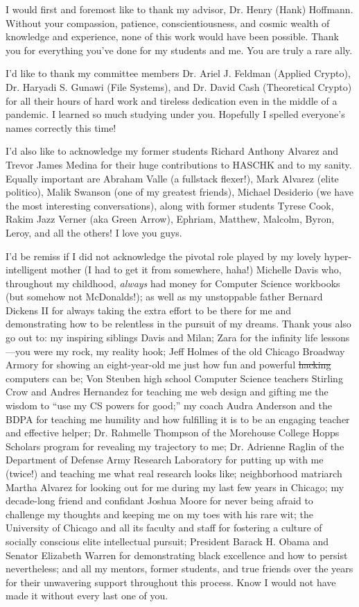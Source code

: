 \acknowledgments
I would first and foremost like to thank my advisor, Dr. Henry (Hank) Hoffmann.
Without your compassion, patience, conscientiousness, and cosmic wealth of
knowledge and experience, none of this work would have been possible. Thank you
for everything you've done for my students and me. You are truly a rare ally.

I'd like to thank my committee members Dr. Ariel J. Feldman (Applied Crypto),
Dr. Haryadi S. Gunawi (File Systems), and Dr. David Cash (Theoretical Crypto)
for all their hours of hard work and tireless dedication even in the middle of a
pandemic. I learned so much studying under you. Hopefully I spelled everyone's
names correctly this time!

I'd also like to acknowledge my former students Richard Anthony Alvarez and
Trevor James Medina for their huge contributions to HASCHK and to my sanity.
Equally important are Abraham Valle (a fullstack flexer!), Mark Alvarez (elite
politico), Malik Swanson (one of my greatest friends), Michael Desiderio (we
have the most interesting conversations), along with former students Tyrese
Cook, Rakim Jazz Verner (aka Green Arrow), Ephriam, Matthew, Malcolm, Byron,
Leroy, and all the others! I love you guys.

I'd be remiss if I did not acknowledge the pivotal role played by my lovely
hyper-intelligent mother (I had to get it from somewhere, haha!) Michelle Davis
who, throughout my childhood, \emph{always} had money for Computer Science
workbooks (but somehow not McDonalds!); as well as my unstoppable father Bernard
Dickens II for always taking the extra effort to be there for me and
demonstrating how to be relentless in the pursuit of my dreams. Thank yous also
go out to: my inspiring siblings Davis and Milan; Zara for the infinity life
lessons---you were my rock, my reality hook; Jeff Holmes of the old Chicago
Broadway Armory for showing an eight-year-old me just how fun and powerful
\sout{hacking} computers can be; Von Steuben high school Computer Science
teachers Stirling Crow and Andres Hernandez for teaching me web design and
gifting me the wisdom to ``use my CS powers for good;'' my coach Audra Anderson
and the BDPA for teaching me humility and how fulfilling it is to be an engaging
teacher and effective helper; Dr. Rahmelle Thompson of the Morehouse College
Hopps Scholars program for revealing my trajectory to me; Dr. Adrienne Raglin of
the Department of Defense Army Research Laboratory for putting up with me
(twice!) and teaching me what real research looks like; neighborhood matriarch
Martha Alvarez for looking out for me during my last few years in Chicago; my
decade-long friend and confidant Joshua Moore for never being afraid to
challenge my thoughts and keeping me on my toes with his rare wit; the
University of Chicago and all its faculty and staff for fostering a culture of
socially conscious elite intellectual pursuit; President Barack H. Obama and
Senator Elizabeth Warren for demonstrating black excellence and how to persist
nevertheless; and all my mentors, former students, and true friends over the
years for their unwavering support throughout this process. Know I would not
have made it without every last one of you.

